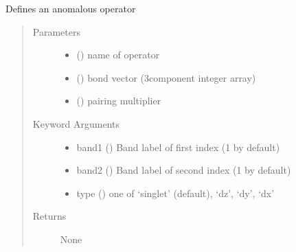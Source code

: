 \documentclass[letterpaper,10pt,english]{sphinxmanual}
\begin{document}

\begin{fulllineitems}
\label{\detokenize{functions:pyqcm.anomalous_operator}}
\sphinxAtStartPar
Defines an anomalous operator
\begin{quote}\begin{description}
\item[{Parameters}] \leavevmode\begin{itemize}
\item {} 
\sphinxAtStartPar
{} () \textendash{} name of operator

\item {} 
\sphinxAtStartPar
{} (\sphinxstyleliteralemphasis{\sphinxupquote{{[}}}\sphinxstyleliteralemphasis{\sphinxupquote{{]}}}) \textendash{} bond vector (3\sphinxhyphen{}component integer array)

\item {} 
\sphinxAtStartPar
{} () \textendash{} pairing multiplier

\end{itemize}

\item[{Keyword Arguments}] \leavevmode\begin{itemize}
\item {} 
\sphinxAtStartPar
band1 () \textendash{} Band label of first index (1 by default)

\item {} 
\sphinxAtStartPar
band2 () \textendash{} Band label of second index (1 by default)

\item {} 
\sphinxAtStartPar
type () \textendash{} one of ‘singlet’ (default), ‘dz’, ‘dy’, ‘dx’

\end{itemize}

\item[{Returns}] \leavevmode
\sphinxAtStartPar
None

\end{description}\end{quote}

\end{fulllineitems}
\end{document}
